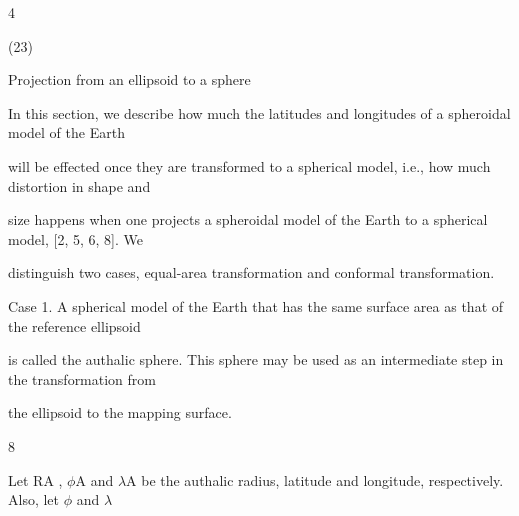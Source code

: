 \documentclass[a4paper,portrait,12pt]{article}
\begin{document}
4





(23)





\begin{flushleft}
Projection from an ellipsoid to a sphere
\end{flushleft}





\begin{flushleft}
In this section, we describe how much the latitudes and longitudes of a spheroidal model of the Earth
\end{flushleft}


\begin{flushleft}
will be effected once they are transformed to a spherical model, i.e., how much distortion in shape and
\end{flushleft}


\begin{flushleft}
size happens when one projects a spheroidal model of the Earth to a spherical model, [2, 5, 6, 8]. We
\end{flushleft}


\begin{flushleft}
distinguish two cases, equal-area transformation and conformal transformation.
\end{flushleft}


\begin{flushleft}
Case 1. A spherical model of the Earth that has the same surface area as that of the reference ellipsoid
\end{flushleft}


\begin{flushleft}
is called the authalic sphere. This sphere may be used as an intermediate step in the transformation from
\end{flushleft}


\begin{flushleft}
the ellipsoid to the mapping surface.
\end{flushleft}


8





\begin{flushleft}
\newpage
Let RA , $\phi$A and $\lambda$A be the authalic radius, latitude and longitude, respectively. Also, let $\phi$ and $\lambda$
\end{flushleft}
\end{document}
